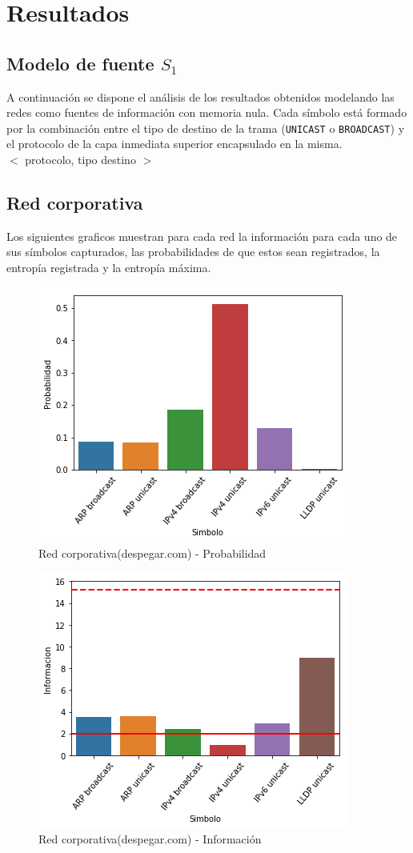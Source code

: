 \section{Resultados}

\subsection{Modelo de fuente $S_1$}

A continuación se dispone el análisis de los resultados obtenidos modelando las redes como fuentes de información con memoria nula. Cada símbolo está formado por la combinación entre el tipo de destino de la trama (\texttt{UNICAST} o \texttt{BROADCAST}) y el protocolo de la capa inmediata superior encapsulado en la misma. \\

$<$ protocolo, tipo destino $>$ \\

\subsection{Red corporativa}

Los siguientes graficos muestran para cada red la información para cada uno de sus símbolos capturados, las probabilidades de que estos sean registrados, la entropía registrada y la entropía máxima.

\begin{figure}[H]
	\centering
	\includegraphics[width=.5\linewidth]{imagenes/despegar_barras_prob}
	\caption{Red corporativa(despegar.com) - Probabilidad}
\end{figure}

\begin{figure}[H]
	\centering
	\includegraphics[width=.5\linewidth]{imagenes/despegar_barras_info}
	\caption{Red corporativa(despegar.com) - Información}
\end{figure}

